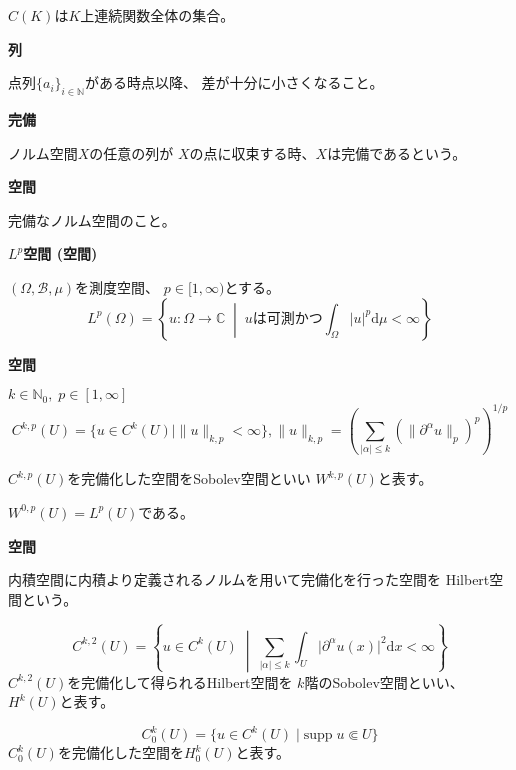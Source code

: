 \documentclass[12pt,b5paper]{ltjsarticle}
\begin{document}
\hrulefill

$C(K)$は$K$上連続関数全体の集合。


\textbf{列}

点列$\{a_{i}\}_{i\in\mathbb{N}}$がある時点以降、
差が十分に小さくなること。


\textbf{完備}

ノルム空間$X$の任意の列が
$X$の点に収束する時、$X$は完備であるという。

\textbf{空間}

完備なノルム空間のこと。

\textbf{$L^{p}$空間 (空間)}

$(\Omega,\mathcal{B},\mu)$を測度空間、
$p\in [1,\infty)$とする。
\begin{equation}
 L^{p}(\Omega) =
  \left\{
   u:\Omega\to\mathbb{C} \; \middle| \; uは可測かつ \int_{\Omega} \lvert u \rvert^{p}\mathrm{d}\mu < \infty
  \right\}
\end{equation}



\textbf{空間}

$k\in\mathbb{N}_{0}, \; p\in [1,\infty]$
\begin{equation}
 C^{k,p}(U) = \{ u\in C^{k}(U) \mid \|u\|_{k,p} < \infty\}
  , \|u\|_{k,p} = \left(\sum_{\lvert \alpha \rvert \leq k} (\|\partial^{\alpha}u\|_{p})^{p}\right)^{1/p}
\end{equation}

$C^{k,p}(U)$を完備化した空間をSobolev空間といい
$W^{k,p}(U)$と表す。

$W^{0,p}(U)=L^{p}(U)$である。



\textbf{空間}

内積空間に内積より定義されるノルムを用いて完備化を行った空間を
Hilbert空間という。

\begin{equation}
 C^{k,2}(U) = \left\{ u\in C^{k}(U) \; \middle| \; \sum_{\lvert \alpha \rvert\leq k}\int_{U}\lvert \partial^{\alpha}u(x) \rvert^{2}\mathrm{d}x < \infty \right\}
\end{equation}
$C^{k,2}(U)$を完備化して得られるHilbert空間を
$k$階のSobolev空間といい、$H^{k}(U)$と表す。

\begin{equation}
 C_{0}^{k}(U) = \{ u\in C^{k}(U) \mid \mathrm{supp}\; u \Subset U\}
\end{equation}
$C_{0}^{k}(U)$を完備化した空間を$H_{0}^{k}(U)$と表す。
\end{document}
